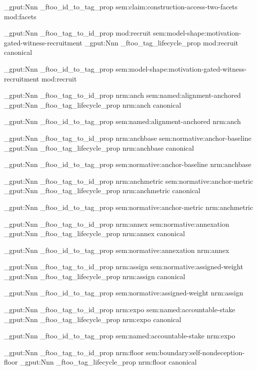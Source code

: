 \prop_gput:Nnn \g_ftoo_id_to_tag_prop { sem:claim:construction-access-two-facets } { mod:facets }


\prop_gput:Nnn \g_ftoo_tag_to_id_prop { mod:recruit } { sem:model-shape:motivation-gated-witness-recruitment }
\prop_gput:Nnn \g_ftoo_tag_lifecycle_prop { mod:recruit } { canonical }

\prop_gput:Nnn \g_ftoo_id_to_tag_prop { sem:model-shape:motivation-gated-witness-recruitment } { mod:recruit }


\prop_gput:Nnn \g_ftoo_tag_to_id_prop { nrm:anch } { sem:named:alignment-anchored }
\prop_gput:Nnn \g_ftoo_tag_lifecycle_prop { nrm:anch } { canonical }

\prop_gput:Nnn \g_ftoo_id_to_tag_prop { sem:named:alignment-anchored } { nrm:anch }


\prop_gput:Nnn \g_ftoo_tag_to_id_prop { nrm:anchbase } { sem:normative:anchor-baseline }
\prop_gput:Nnn \g_ftoo_tag_lifecycle_prop { nrm:anchbase } { canonical }

\prop_gput:Nnn \g_ftoo_id_to_tag_prop { sem:normative:anchor-baseline } { nrm:anchbase }


\prop_gput:Nnn \g_ftoo_tag_to_id_prop { nrm:anchmetric } { sem:normative:anchor-metric }
\prop_gput:Nnn \g_ftoo_tag_lifecycle_prop { nrm:anchmetric } { canonical }

\prop_gput:Nnn \g_ftoo_id_to_tag_prop { sem:normative:anchor-metric } { nrm:anchmetric }


\prop_gput:Nnn \g_ftoo_tag_to_id_prop { nrm:annex } { sem:normative:annexation }
\prop_gput:Nnn \g_ftoo_tag_lifecycle_prop { nrm:annex } { canonical }

\prop_gput:Nnn \g_ftoo_id_to_tag_prop { sem:normative:annexation } { nrm:annex }


\prop_gput:Nnn \g_ftoo_tag_to_id_prop { nrm:assign } { sem:normative:assigned-weight }
\prop_gput:Nnn \g_ftoo_tag_lifecycle_prop { nrm:assign } { canonical }

\prop_gput:Nnn \g_ftoo_id_to_tag_prop { sem:normative:assigned-weight } { nrm:assign }


\prop_gput:Nnn \g_ftoo_tag_to_id_prop { nrm:expo } { sem:named:accountable-stake }
\prop_gput:Nnn \g_ftoo_tag_lifecycle_prop { nrm:expo } { canonical }

\prop_gput:Nnn \g_ftoo_id_to_tag_prop { sem:named:accountable-stake } { nrm:expo }


\prop_gput:Nnn \g_ftoo_tag_to_id_prop { nrm:floor } { sem:boundary:self-nondeception-floor }
\prop_gput:Nnn \g_ftoo_tag_lifecycle_prop { nrm:floor } { canonical }

